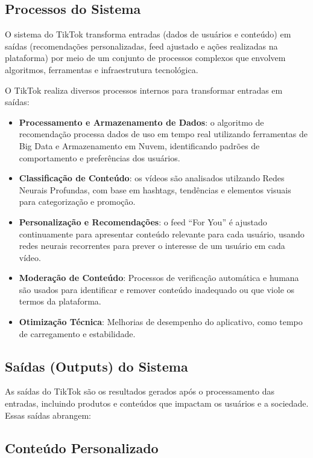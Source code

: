 \subsection{Processos do Sistema}

O sistema do TikTok transforma entradas (dados de usuários e conteúdo) em saídas (recomendações personalizadas, feed ajustado e ações realizadas na plataforma) por meio de um conjunto de processos complexos que envolvem algoritmos, ferramentas e infraestrutura tecnológica. \vskip0.3cm

O TikTok realiza diversos processos internos para transformar entradas em saídas:

\begin{itemize}
    \item \textbf{Processamento e Armazenamento de Dados}: o algoritmo de recomendação processa dados de uso em tempo real utilizando ferramentas de Big Data e Armazenamento em Nuvem, identificando padrões de comportamento e preferências dos usuários.
    \item \textbf{Classificação de Conteúdo}: os vídeos são analisados utilzando Redes Neurais Profundas, com base em hashtags, tendências e elementos visuais para categorização e promoção.
    \item \textbf{Personalização e Recomendações}: o feed “For You” é ajustado continuamente para apresentar conteúdo relevante para cada usuário, usando redes neurais recorrentes para prever o interesse de um usuário em cada vídeo.
    \item \textbf{Moderação de Conteúdo}: Processos de verificação automática e humana são usados para identificar e remover conteúdo inadequado ou que viole os termos da plataforma.
    \item \textbf{Otimização Técnica}: Melhorias de desempenho do aplicativo, como tempo de carregamento e estabilidade.
\end{itemize}



\subsection{Saídas (Outputs) do Sistema}

As saídas do TikTok são os resultados gerados após o processamento das entradas, incluindo produtos e conteúdos que impactam os usuários e a sociedade. Essas saídas abrangem:

\subsection{Conteúdo Personalizado}


